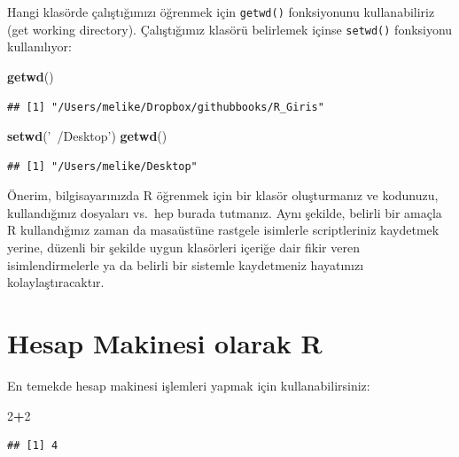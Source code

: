 \documentclass[]{book}
\newenvironment{Shaded}{\begin{snugshade}}{\end{snugshade}}
\newcommand{\DecValTok}[1]{\textcolor[rgb]{0.00,0.00,0.81}{#1}}
\newcommand{\KeywordTok}[1]{\textcolor[rgb]{0.13,0.29,0.53}{\textbf{#1}}}
\newcommand{\NormalTok}[1]{#1}
\newcommand{\OperatorTok}[1]{\textcolor[rgb]{0.81,0.36,0.00}{\textbf{#1}}}
\newcommand{\StringTok}[1]{\textcolor[rgb]{0.31,0.60,0.02}{#1}}
\begin{document}
Hangi klasörde çalıştığımızı öğrenmek için \texttt{getwd()} fonksiyonunu
kullanabiliriz (get working directory). Çalıştığımız klasörü belirlemek
içinse \texttt{setwd()} fonksiyonu kullanılıyor:

\begin{Shaded}
\begin{Highlighting}[]
\KeywordTok{getwd}\NormalTok{()}
\end{Highlighting}
\end{Shaded}

\begin{verbatim}
## [1] "/Users/melike/Dropbox/githubbooks/R_Giris"
\end{verbatim}

\begin{Shaded}
\begin{Highlighting}[]
\KeywordTok{setwd}\NormalTok{(}\StringTok{'~/Desktop'}\NormalTok{)}
\KeywordTok{getwd}\NormalTok{()}
\end{Highlighting}
\end{Shaded}

\begin{verbatim}
## [1] "/Users/melike/Desktop"
\end{verbatim}

Önerim, bilgisayarınızda R öğrenmek için bir klasör oluşturmanız ve
kodunuzu, kullandığınız dosyaları vs.~hep burada tutmanız. Aynı şekilde,
belirli bir amaçla R kullandığınız zaman da masaüstüne rastgele
isimlerle scriptleriniz kaydetmek yerine, düzenli bir şekilde uygun
klasörleri içeriğe dair fikir veren isimlendirmelerle ya da belirli bir
sistemle kaydetmeniz hayatınızı kolaylaştıracaktır.

\hypertarget{hesap-makinesi-olarak-r}{%
\section{Hesap Makinesi olarak R}\label{hesap-makinesi-olarak-r}}

En temekde hesap makinesi işlemleri yapmak için kullanabilirsiniz:

\begin{Shaded}
\begin{Highlighting}[]
\DecValTok{2}\OperatorTok{+}\DecValTok{2}
\end{Highlighting}
\end{Shaded}

\begin{verbatim}
## [1] 4
\end{verbatim}
\end{document}
